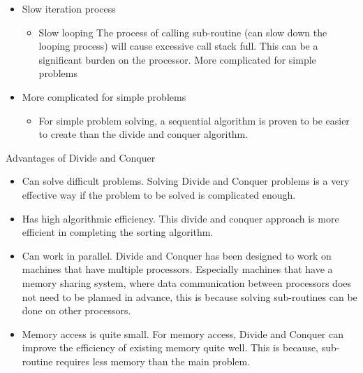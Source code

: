 \documentclass[12pt,titlepage]{article}
\begin{document}
\begin{itemize}
    \item Slow iteration process
    \begin{itemize}
        \item Slow looping The process of calling sub-routine (can slow down the looping process) will cause excessive call stack full. This can be a significant burden on the processor. More complicated for simple problems
    \end{itemize}
    \item More complicated for simple problems
    \begin{itemize}
        \item For simple problem solving, a sequential algorithm is proven to be easier to create than the divide and conquer algorithm.
    \end{itemize}
\end{itemize}

Advantages of Divide and Conquer

\begin{itemize}
    \item Can solve difficult problems. Solving Divide and Conquer problems is a very effective way if the problem to be solved is complicated enough.
    \item Has high algorithmic efficiency. This divide and conquer approach is more efficient in completing the sorting algorithm.
    \item Can work in parallel. Divide and Conquer has been designed to work on machines that have multiple processors. Especially machines that have a memory sharing system, where data communication between processors does not need to be planned in advance, this is because solving sub-routines can be done on other processors.
    \item Memory access is quite small. For memory access, Divide and Conquer can improve the efficiency of existing memory quite well. This is because, sub-routine requires less memory than the main problem.
\end{itemize}
\end{document}
